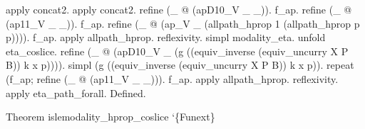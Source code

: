 \begin{coqdoccode}
\begin{coqdoccomment}
apply\coqdocindent{0.50em}
concat2.\coqdoceol
\coqdocindent{1.00em}
apply\coqdocindent{0.50em}
concat2.\coqdoceol
\coqdoceol
\coqdocindent{1.00em}
refine\coqdocindent{0.50em}
(\_\coqdocindent{0.50em}
@\coqdocindent{0.50em}
(apD10\_V\coqdocindent{0.50em}
\_\coqdocindent{0.50em}
\_)).\coqdocindent{0.50em}
\coqdoceol
\coqdocindent{1.00em}
f\_ap.\coqdocindent{0.50em}
refine\coqdocindent{0.50em}
(\_\coqdocindent{0.50em}
@\coqdocindent{0.50em}
(ap11\_V\coqdocindent{0.50em}
\_\coqdocindent{0.50em}
\_)).\coqdoceol
\coqdocindent{1.00em}
f\_ap.\coqdocindent{0.50em}
refine\coqdocindent{0.50em}
(\_\coqdocindent{0.50em}
@\coqdocindent{0.50em}
(ap\_V\coqdocindent{0.50em}
\_\coqdocindent{0.50em}
(allpath\_hprop\coqdocindent{0.50em}
1\coqdocindent{0.50em}
(allpath\_hprop\coqdocindent{0.50em}
p\coqdocindent{0.50em}
p)))).\coqdoceol
\coqdocindent{1.00em}
f\_ap.\coqdocindent{0.50em}
apply\coqdocindent{0.50em}
allpath\_hprop.\coqdoceol
\coqdoceol
\coqdocindent{1.00em}
reflexivity.\coqdoceol
\coqdoceol
\coqdocindent{1.00em}
simpl\coqdocindent{0.50em}
modality\_eta.\coqdocindent{0.50em}
unfold\coqdocindent{0.50em}
eta\_coslice.\coqdoceol
\coqdocindent{1.00em}
refine\coqdocindent{0.50em}
(\_\coqdocindent{0.50em}
@\coqdocindent{0.50em}
(apD10\_V\coqdocindent{0.50em}
\_\coqdocindent{0.50em}
(g\coqdocindent{0.50em}
((equiv\_inverse\coqdocindent{0.50em}
(equiv\_uncurry\coqdocindent{0.50em}
X\coqdocindent{0.50em}
P\coqdocindent{0.50em}
B))\coqdocindent{0.50em}
k\coqdocindent{0.50em}
x\coqdocindent{0.50em}
p)))).\coqdoceol
\coqdocindent{1.00em}
simpl\coqdocindent{0.50em}
(g\coqdocindent{0.50em}
((equiv\_inverse\coqdocindent{0.50em}
(equiv\_uncurry\coqdocindent{0.50em}
X\coqdocindent{0.50em}
P\coqdocindent{0.50em}
B))\coqdocindent{0.50em}
k\coqdocindent{0.50em}
x\coqdocindent{0.50em}
p)).\coqdoceol
\coqdocindent{1.00em}
repeat\coqdocindent{0.50em}
(f\_ap;\coqdocindent{0.50em}
refine\coqdocindent{0.50em}
(\_\coqdocindent{0.50em}
@\coqdocindent{0.50em}
(ap11\_V\coqdocindent{0.50em}
\_\coqdocindent{0.50em}
\_))).\coqdoceol
\coqdocindent{1.00em}
f\_ap.\coqdocindent{0.50em}
apply\coqdocindent{0.50em}
allpath\_hprop.\coqdoceol
\coqdoceol
\coqdocindent{1.00em}
reflexivity.\coqdoceol
\coqdocindent{1.00em}
\coqdoceol
\coqdocindent{1.00em}
apply\coqdocindent{0.50em}
eta\_path\_forall.\coqdoceol
Defined.\coqdoceol
\end{coqdoccomment}
\coqdoceol
\coqdocemptyline
\coqdocemptyline
\coqdocnoindent
\begin{coqdoccomment}
\coqdoceol
Theorem\coqdocindent{0.50em}
islemodality\_hprop\_coslice\coqdocindent{0.50em}
`\{Funext\}\coqdocindent{0.50em}

\end{coqdoccomment}
\end{coqdoccode}
